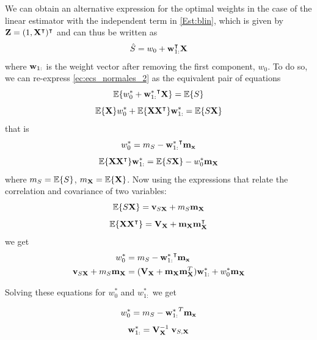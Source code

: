 {We can obtain an alternative expression for the optimal weights in the case of the linear estimator with the independent term in \eqref{Est:blin}, which is given by ${\bf Z}=(1, {\bf X}^\intercal)^\intercal$ and can thus be written as
\begin{align}
\hat S = w_0 + {\bf w}_{1:}^\intercal {\bf X}
\end{align}
where ${\bf w}_{1:}$ is the weight vector after removing the first component, $w_0$. To do so, we can re-express \eqref{ec:ecs_normales_2} as the equivalent pair of equations
\begin{equation}
\label{Est:E0}
\mathbb{E}\{w_0^* + {{\bf w}_{1:}^*}^\intercal {\bf X} \} = \mathbb{E}\{S\}
\end{equation}
\begin{equation}
\label{Est:Ex}
\mathbb{E}\{{\bf X}\} w_0^* + \mathbb{E}\{{\bf X}{\bf X}^\intercal\}{\bf w}_{1:}^* = \mathbb{E}\{S{\bf X}\}
\end{equation}
that is
\begin{equation}
w_0^* = m_S - {{\bf w}_{1:}^*}^\intercal{\bf m_x}
\end{equation}
\begin{align}
\label{Est:PrincipioOrtV2b}
\mathbb{E}\{{\bf X} {\bf X}^\intercal \}{\bf w}_{1:}^* = \mathbb{E}\{S {\bf X}\} - w_0^* {\bf m_X}  
\end{align}
where $m_S=\mathbb{E}\{S\}$, $m_{\bf X} =\mathbb{E}\{{\bf X}\}$.} Now using the expressions that relate the correlation and covariance of two variables:
\begin{equation}
\mathbb{E}\{S {\bf X}\} = {\bf v}_{S{\bf X}} + m_S {\bf m_X}
\end{equation}
\begin{equation}
\mathbb{E}\{{\bf X}{\bf X}^\intercal\} = {\bf V_X} + {\bf m_X}{\bf m}_{\bf X}^\intercal
\end{equation}
we get 
{\begin{align}
w_0^* &= m_S  - {{\bf w}_{1:}^*}^\intercal{\bf m_x}  \\
\label{Est:PrincipioOrtV2c}
{\bf v}_{S{\bf X}} + m_S {\bf m_X} 
	&= ({\bf V_X} + {\bf m_X}{\bf m}_{\bf X}^T){\bf w}_{1:}^* + w_0^* {\bf m_X}  
\end{align}}

{Solving these equations for $w_0^*$ and $w_{1:}^*$ we get
\begin{framed}
\begin{equation}
w_0^* = m_S - {{\bf w}_{1:}^*}^T{\bf m_x} 
\label{ec:solucionw0}
\end{equation}
\begin{equation}
\label{ec:solucionw}
{\bf w}_{1:}^* = {{\bf V}_{\bf X}^{-1}} \; {\bf v}_{S,{\bf X}}\end{equation}
\end{framed}}

